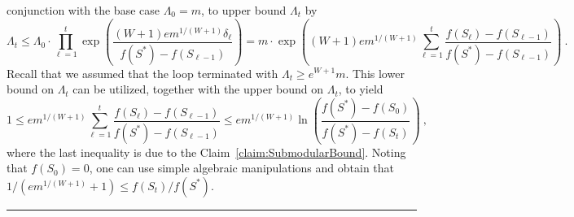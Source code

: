 \documentclass[11pt]{article}
\theoremstyle{plain}
\theoremstyle{definition}
\newcommand{\qedsymb}{\hfill{\rule{2mm}{2mm}}}
\renewenvironment{proof}{\begin{trivlist} \item[\hspace{\labelsep}{\bf \noindent Proof.\/}] }{\qedsymb\end{trivlist}}\newenvironment{proofof}[1]{\begin{trivlist} \item[\hspace{\labelsep}{\bf \noindent Proof of #1.\/}] }{\qedsymb\end{trivlist}}\newenvironment{MyEqn}[1]{\setlength\arraycolsep{2pt}\begin{eqnarray*} #1}{\end{eqnarray*}}
\begin{document}
\begin{proof}
conjunction with the base case $\Lambda_0 = m$, to upper bound
$\Lambda_t$ by
$$
\Lambda_t \leq \Lambda_0 \cdot \prod_{\ell = 1}^{t} \exp
\left(\frac{(W+1) e m^{1/(W+1)} \delta_\ell}{f(S^*) -
f(S_{\ell-1})}\right) = m \cdot \exp \left((W+1) e m^{1/(W+1)}
\sum_{\ell = 1}^{t}\frac{ f(S_\ell) - f(S_{\ell-1})}{f(S^*) -
f(S_{\ell-1})}\right) \ .
$$
Recall that we assumed that the loop terminated with $\Lambda_t
\geq e^{W+1} m$. This lower bound on $\Lambda_t$ can be utilized,
together with the upper bound on $\Lambda_t$, to yield
$$
1 \leq em^{1/(W+1)} \sum_{\ell = 1}^{t}\frac{ f(S_\ell) -
f(S_{\ell-1})}{f(S^*) - f(S_{\ell-1})} \leq em^{1/(W+1)}
\ln\left(\frac{f(S^*) - f(S_0)}{f(S^*) - f(S_t)} \right) \ ,
$$
where the last inequality is due to the
Claim~\ref{claim:SubmodularBound}. Noting that $f(S_0) = 0$, one
can use simple algebraic manipulations and obtain that $1 /
(em^{1/(W+1)} + 1) \leq f(S_t) / f(S^*)$.~
\end{proof}
\end{document}
